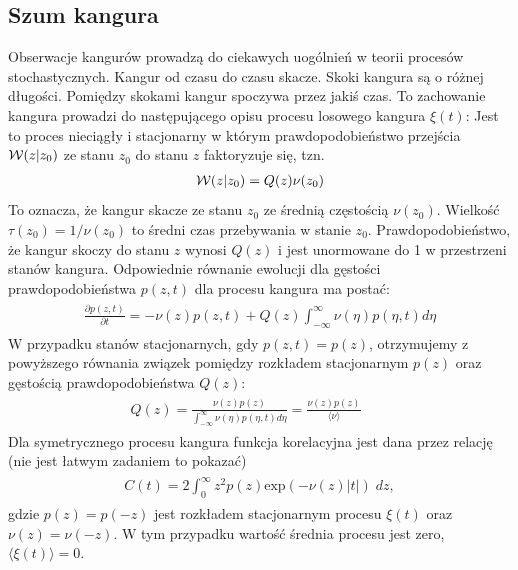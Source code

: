 \documentclass[a4paper,12pt,polish]{sphinxmanual}
\begin{document}
\subsection{Szum kangura}
\label{ch3/chIII031:szum-kangura}
Obserwacje kangurów prowadzą do ciekawych uogólnień w teorii procesów stochastycznych. Kangur od czasu do czasu skacze. Skoki kangura są o różnej długości. Pomiędzy skokami kangur spoczywa przez jakiś czas. To zachowanie kangura prowadzi do następującego opisu procesu losowego kangura $\xi(t)$: Jest to proces nieciągły i stacjonarny w którym prawdopodobieństwo przejścia ${\cal W}(z \vert z_0)$ ze stanu $z_0$ do stanu $z$ faktoryzuje się, tzn.
\label{ch3/chIII031:equation-eqn28}\begin{gather}
\begin{split}{\cal W}(z \vert z_0) = Q(z) \nu (z_0)\end{split}\label{ch3/chIII031-eqn28}
\end{gather}
To oznacza, że kangur skacze ze stanu $z_0$ ze średnią częstością $\nu(z_0)$. Wielkość $\tau(z_0) = 1/\nu(z_0)$ to średni czas przebywania w stanie $z_0$. Prawdopodobieństwo, że kangur skoczy do stanu $z$ wynosi $Q(z)$ i jest unormowane do 1 w przestrzeni stanów kangura. Odpowiednie równanie ewolucji dla gęstości prawdopodobieństwa $p(z, t)$ dla procesu kangura ma postać:
\label{ch3/chIII031:equation-eqn29}\begin{gather}
\begin{split}{\frac{\partial p(z, t)}{\partial t}} = - \nu (z) p(z, t) + Q(z) \int_{-\infty}^{\infty} \nu (\eta) p(\eta, t) d\eta\end{split}\label{ch3/chIII031-eqn29}
\end{gather}
W przypadku stanów stacjonarnych, gdy $p(z, t) = p(z)$, otrzymujemy z powyższego równania związek pomiędzy rozkładem stacjonarnym $p(z)$ oraz gęstością prawdopodobieństwa $Q(z)$:
\label{ch3/chIII031:equation-eqn30}\begin{gather}
\begin{split}Q(z) = \frac{\nu (z) p(z)}{ \int_{-\infty}^{\infty} \nu (\eta) p(\eta, t) d\eta } = \frac{\nu (z) p(z)}{\langle \nu \rangle} \qquad\end{split}\label{ch3/chIII031-eqn30}
\end{gather}
Dla symetrycznego procesu kangura funkcja korelacyjna jest dana przez relację (nie jest łatwym zadaniem to pokazać)
\label{ch3/chIII031:equation-eqn31}\begin{gather}
\begin{split}C(t) = 2 \int_{0}^{\infty} z^2 p(z) \mbox{exp}(-\nu(z)\vert t\vert) \;dz,\end{split}\label{ch3/chIII031-eqn31}
\end{gather}
gdzie $p(z) = p(-z)$ jest rozkładem stacjonarnym procesu $\xi(t)$ oraz $\nu(z) = \nu(-z)$. W tym przypadku wartość średnia procesu jest zero, $\langle \xi(t) \rangle = 0$.
\end{document}
